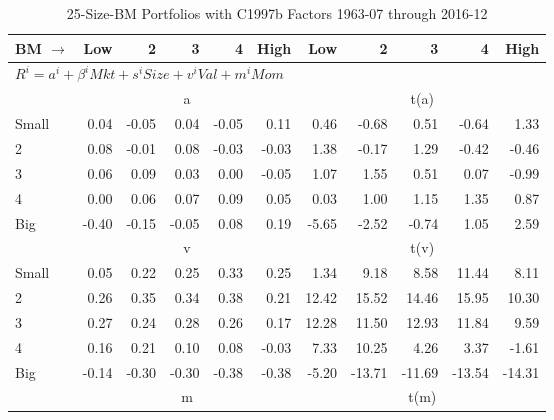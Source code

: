 
\begin{table}[!ht]
\centering
\caption{25-Size-BM Portfolios with C1997b Factors 1963-07 through 2016-12}
\begin{tabular}{lrrrrrrrrrr}
  \toprule
    BM $\rightarrow$ & Low & 2 & 3 & 4 & High & Low & 2 & 3 & 4 & High \\ 
  \midrule
  \multicolumn{11}{l}{$R^i=a^i+\beta^iMkt+s^iSize+v^iVal+m^iMom$} \\

  
    
      & \multicolumn{5}{c}{a} & \multicolumn{5}{c}{t(a)}
    
    \\
      \cmidrule(r){2-6} \cmidrule(r){7-11}

    Small   & 0.04  & -0.05  & 0.04  & -0.05  & 0.11  & 0.46  & -0.68  & 0.51  & -0.64  & 1.33  \\
         2  & 0.08  & -0.01  & 0.08  & -0.03  & -0.03  & 1.38  & -0.17  & 1.29  & -0.42  & -0.46  \\
         3  & 0.06  & 0.09  & 0.03  & 0.00  & -0.05  & 1.07  & 1.55  & 0.51  & 0.07  & -0.99  \\
         4  & 0.00  & 0.06  & 0.07  & 0.09  & 0.05  & 0.03  & 1.00  & 1.15  & 1.35  & 0.87  \\
    Big     & -0.40  & -0.15  & -0.05  & 0.08  & 0.19  & -5.65  & -2.52  & -0.74  & 1.05  & 2.59  \\

  
    
      & \multicolumn{5}{c}{v} & \multicolumn{5}{c}{t(v)}
    
    \\
      \cmidrule(r){2-6} \cmidrule(r){7-11}

    Small   & 0.05  & 0.22  & 0.25  & 0.33  & 0.25  & 1.34  & 9.18  & 8.58  & 11.44  & 8.11  \\
         2  & 0.26  & 0.35  & 0.34  & 0.38  & 0.21  & 12.42  & 15.52  & 14.46  & 15.95  & 10.30  \\
         3  & 0.27  & 0.24  & 0.28  & 0.26  & 0.17  & 12.28  & 11.50  & 12.93  & 11.84  & 9.59  \\
         4  & 0.16  & 0.21  & 0.10  & 0.08  & -0.03  & 7.33  & 10.25  & 4.26  & 3.37  & -1.61  \\
    Big     & -0.14  & -0.30  & -0.30  & -0.38  & -0.38  & -5.20  & -13.71  & -11.69  & -13.54  & -14.31  \\

  
    
      & \multicolumn{5}{c}{m} & \multicolumn{5}{c}{t(m)}
    

\end{tabular}
\end{table}
